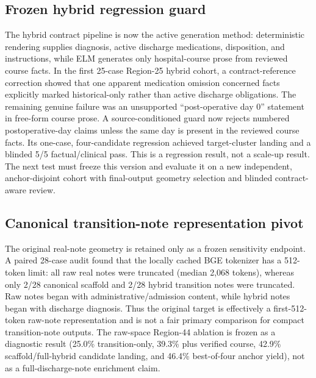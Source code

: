 \documentclass[11pt]{article}
\begin{document}
\subsection{Frozen hybrid regression guard}

The hybrid contract pipeline is now the active generation method: deterministic rendering supplies diagnosis, active discharge medications, disposition, and instructions, while ELM generates only hospital-course prose from reviewed course facts.  In the first 25-case Region-25 hybrid cohort, a contract-reference correction showed that one apparent medication omission concerned facts explicitly marked historical-only rather than active discharge obligations.  The remaining genuine failure was an unsupported ``post-operative day 0'' statement in free-form course prose.  A source-conditioned guard now rejects numbered postoperative-day claims unless the same day is present in the reviewed course facts.  Its one-case, four-candidate regression achieved target-cluster landing and a blinded 5/5 factual/clinical pass.  This is a regression result, not a scale-up result.  The next test must freeze this version and evaluate it on a new independent, anchor-disjoint cohort with final-output geometry selection and blinded contract-aware review.

\subsection{Canonical transition-note representation pivot}

The original real-note geometry is retained only as a frozen sensitivity endpoint.  A paired 28-case audit found that the locally cached BGE tokenizer has a 512-token limit: all raw real notes were truncated (median 2,068 tokens), whereas only 2/28 canonical scaffold and 2/28 hybrid transition notes were truncated.  Raw notes began with administrative/admission content, while hybrid notes began with discharge diagnosis.  Thus the original target is effectively a first-512-token raw-note representation and is not a fair primary comparison for compact transition-note outputs.  The raw-space Region-44 ablation is frozen as a diagnostic result (25.0\% transition-only, 39.3\% plus verified course, 42.9\% scaffold/full-hybrid candidate landing, and 46.4\% best-of-four anchor yield), not as a full-discharge-note enrichment claim.
\end{document}
